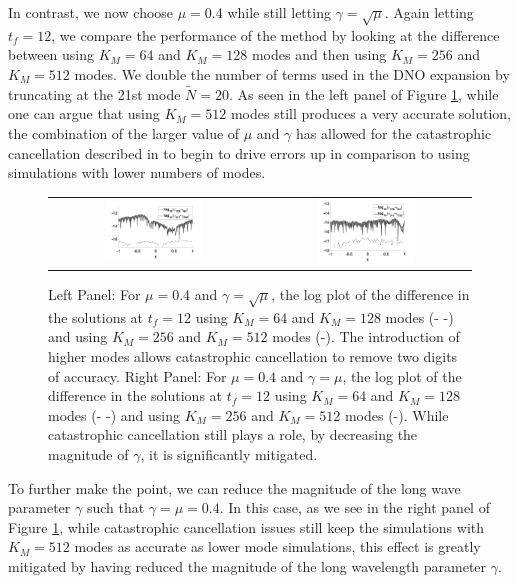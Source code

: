 \documentclass[a4paper,11pt]{article}
\begin{document}
In contrast, we now choose $\mu=0.4$ while still letting $\gamma=\sqrt{\mu}$.  Again letting $t_{f} =12$, we compare the performance of the method by looking at the difference between using $K_{M}=64$ and $K_{M}=128$ modes and then using $K_{M}=256$ and $K_{M}=512$ modes.  We double the number of terms used in the DNO expansion by truncating at the 21st mode $\tilde{N}=20$.  As seen in the left panel of Figure \ref{fig:convcompfail}, while one can argue that using $K_{M}=512$  modes still produces a very accurate solution, the combination of the larger value of $\mu$ and $\gamma$ has allowed for the catastrophic cancellation described in \cite{wilkening} to begin to drive errors up in comparison to using simulations with lower numbers of modes.   
\begin{figure}[h]
\centering
\begin{tabular}{cc}
\includegraphics[width=0.48\textwidth]{conv_plot_mupt4_tf_12} & \includegraphics[width=0.48\textwidth]{conv_plot_mupt4_gampt4_tf_12}
\end{tabular}
\caption{ Left Panel: For $\mu=0.4$ and $\gamma=\sqrt{\mu}$, the log plot of the difference in the solutions at $t_{f}=12$ using $K_{M}=64$ and $K_{M}=128$ modes (- -) and using $K_{M}=256$ and $K_{M}=512$ modes (-).  The introduction of higher modes allows catastrophic cancellation to remove two digits of accuracy. Right Panel: For $\mu=0.4$ and $\gamma=\mu$, the log plot of the difference in the solutions at $t_{f}=12$ using $K_{M}=64$ and $K_{M}=128$ modes (- -) and using $K_{M}=256$ and $K_{M}=512$ modes (-). While catastrophic cancellation still plays a role, by decreasing the magnitude of $\gamma$, it is significantly mitigated.}
\label{fig:convcompfail}
\end{figure}
To further make the point, we can reduce the magnitude of the long wave parameter $\gamma$ such that $\gamma=\mu=0.4$.  In this case, as we see in the right panel of Figure \ref{fig:convcompfail}, while catastrophic cancellation issues still keep the simulations with $K_{M}=512$ modes as accurate as lower mode simulations, this effect is greatly mitigated by having reduced the magnitude of the long wavelength parameter $\gamma$.
\end{document}
